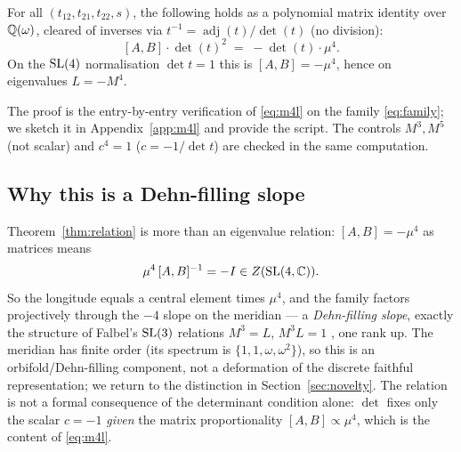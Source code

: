 \begin{theorem}[\sExact]\label{thm:relation}
For all $(t_{12},t_{21},t_{22},s)$, the following holds as a polynomial matrix identity over $\mathbb{Q}(\omega)$,
cleared of inverses via $t^{-1}=\operatorname{adj}(t)/\det(t)$ (no division):
\begin{equation}\label{eq:m4l}
  [A,B]\cdot\det(t)^2 \;=\; -\det(t)\cdot\mu^4 .
\end{equation}
On the $\mathrm{SL}(4)$ normalisation $\det t=1$ this is $[A,B]=-\mu^4$, hence on eigenvalues $L=-M^4$.
\end{theorem}

The proof is the entry-by-entry verification of \eqref{eq:m4l} on the family \eqref{eq:family}; we sketch
it in Appendix~\ref{app:m4l} and provide the script. The controls $M^3,M^5$ (not scalar) and $c^4=1$
($c=-1/\det t$) are checked in the same computation.

\subsection{Why this is a Dehn-filling slope}\label{ss:dehn} Theorem~\ref{thm:relation} is more than an
eigenvalue relation: $[A,B]=-\mu^4$ as matrices means
\begin{equation}\label{eq:central}
  \mu^4\,[A,B]^{-1}=-I\in Z(\mathrm{SL}(4,\mathbb{C})).
\end{equation}
So the longitude equals a central element times $\mu^4$, and the family factors projectively through the
$-4$ slope on the meridian --- a \emph{Dehn-filling slope}, exactly the structure of Falbel's $\mathrm{SL}(3)$
relations $M^3=L$, $M^3L=1$ \cite{fgkrt2014,hmp2016}, one rank up. The meridian has finite order (its
spectrum is $\{1,1,\omega,\omega^2\}$), so this is an orbifold/Dehn-filling component, not a deformation
of the discrete faithful representation; we return to the distinction in Section~\ref{sec:novelty}. The
relation is not a formal consequence of the determinant condition alone: $\det$ fixes only the scalar
$c=-1$ \emph{given} the matrix proportionality $[A,B]\propto\mu^4$, which is the content of
\eqref{eq:m4l}.
